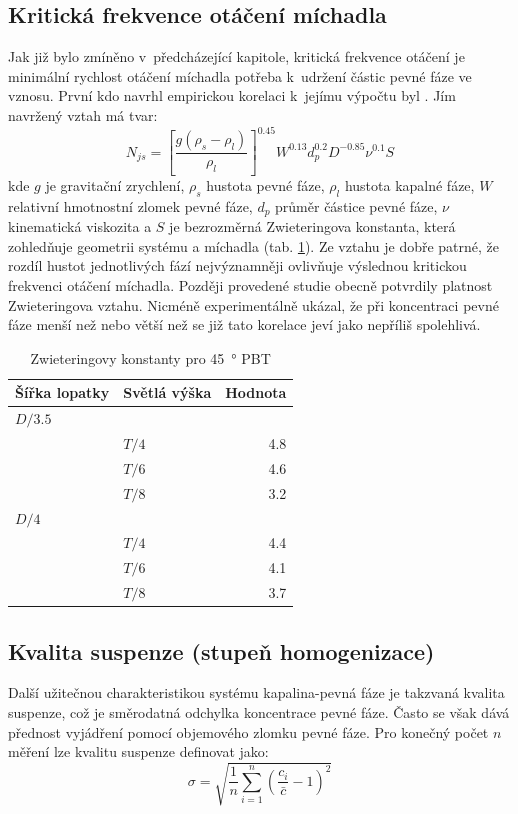 \subsection{Kritická frekvence otáčení míchadla}
Jak již bylo zmíněno v~předcházející kapitole, kritická frekvence otáčení je minimální rychlost otáčení míchadla potřeba k~udržení částic pevné fáze ve vznosu. První kdo navrhl empirickou korelaci k~jejímu výpočtu byl \citet{zwi58}. Jím navržený vztah má tvar:
\begin{equation}
	N_{js} = \left[\frac{g(\rho_{s}-\rho_{l})}{\rho_{l}}\right]^{\num{0.45}}W^{\num{0.13}}d_{p}^{\num{0.2}}D^{\num{-0.85}}\nu^{\num{0.1}}S
	\label{eq:nkrit}
\end{equation} 
kde $g$ je gravitační zrychlení, $\rho_{s}$ hustota pevné fáze, $\rho_{l}$ hustota kapalné fáze, $W$ relativní hmotnostní zlomek pevné fáze, $d_{p}$ průměr částice pevné fáze, $\nu$ kinematická viskozita a $S$ je bezrozměrná Zwieteringova konstanta, která zohledňuje geometrii systému a míchadla (tab. \ref{tab:S}). Ze vztahu je dobře patrné, že rozdíl hustot jednotlivých fází nejvýznamněji ovlivňuje výslednou kritickou frekvenci otáčení míchadla. Později provedené studie \citep{nie68,bal78,chou97} obecně potvrdily platnost Zwieteringova vztahu. Nicméně \citet{chou97} experimentálně ukázal, že při koncentraci pevné fáze menší než  nebo větší než  se již tato korelace jeví jako nepříliš spolehlivá.

\begin{table}[h!]
\centering
\caption{Zwieteringovy konstanty pro \SI{45}{\degree} PBT}
\label{tab:S}
\begin{tabular}{llr}
\toprule
\textbf{Šířka lopatky} & \textbf{Světlá výška} & \textbf{Hodnota} \\
\midrule

$D/\num{3.5}$ \\
& $T/4$ & \num{4.8} \\
& $T/6$ & \num{4.6} \\
& $T/8$ & \num{3.2} \\
$D/4$ \\
& $T/4$ & \num{4.4} \\
& $T/6$ & \num{4.1} \\
& $T/8$ & \num{3.7} \\

\bottomrule
\end{tabular}
\end{table}

\subsection{Kvalita suspenze (stupeň homogenizace)}
Další užitečnou charakteristikou systému kapalina-pevná fáze je takzvaná kvalita suspenze, což je směrodatná odchylka koncentrace pevné fáze. Často se však dává přednost vyjádření pomocí objemového zlomku pevné fáze. Pro konečný počet $n$ měření lze kvalitu suspenze definovat jako:
\begin{equation}
	\sigma = \sqrt{\frac{1}{n}\sum_{i=1}^{n}\left(\frac{c_{i}}{\bar{c}} - 1\right)^{2}}
	\label{eq:kvasus}
\end{equation}  

